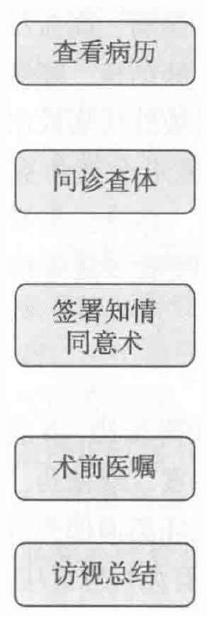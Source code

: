 \documentclass[10pt]{article}
\begin{document}
\begin{center}
\includegraphics[max width=\textwidth]{2024_07_05_645bb794a4d4f32ee0c8g-029}
\end{center}
\end{document}
